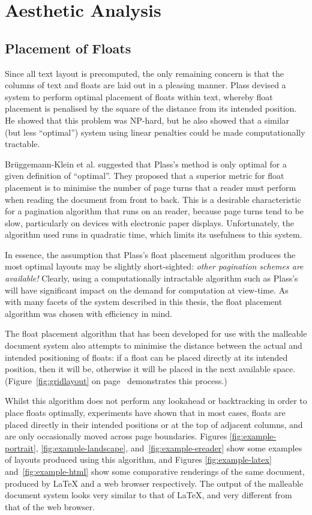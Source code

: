 \chapter{Aesthetic Analysis}\label{ch:aesthetics}

\section{Placement of Floats}
Since all text layout is precomputed, the only remaining concern is that the columns of text and floats are laid out in a pleasing manner. Plass\cite{Plass1981} devised a system to perform optimal placement of floats within text, whereby float placement is penalised by the square of the distance from its intended position. He showed that this problem was NP-hard, but he also showed that a similar (but less ``optimal'') system using linear penalties could be made computationally tractable.

Br\"uggemann-Klein et al.\cite{Bruggemann-Klein1995} suggested that Plass's method is only optimal for a given definition of ``optimal''. They proposed that a superior metric for float placement is to minimise the number of page turns that a reader must perform when reading the document from front to back. This is a desirable characteristic for a pagination algorithm that runs on an \ebook{} reader, because page turns tend to be slow, particularly on devices with electronic paper displays. Unfortunately, the algorithm used runs in quadratic time, which limits its usefulness to this system.

In essence, the assumption that Plass's float placement algorithm produces the most optimal layouts may be slightly short-sighted: \emph{other pagination schemes are available!} Clearly, using a computationally intractable algorithm such as Plass's will have significant impact on the demand for computation at view-time. As with many facets of the system described in this thesis, the float placement algorithm was chosen with efficiency in mind.

The float placement algorithm that has been developed for use with the malleable document system also attempts to minimise the distance between the actual and intended positioning of floats: if a float can be placed directly at its intended position, then it will be, otherwise it will be placed in the next available space. (Figure~\ref{fig:gridlayout} on page~\pageref{fig:gridlayout} demonstrates this process.)

Whilst this algorithm does not perform any lookahead or backtracking in order to place floats optimally, experiments have shown that in most cases, floats are placed directly in their intended positions or at the top of adjacent columns, and are only occasionally moved across page boundaries. Figures \ref{fig:example-portrait}, \ref{fig:example-landscape}, and~\ref{fig:example-ereader} show some examples of layouts produced using this algorithm, and Figures \ref{fig:example-latex} and~\ref{fig:example-html} show some comparative renderings of the same document, produced by \LaTeX{} and a web browser respectively. The output of the malleable document system looks very similar to that of \LaTeX, and very different from that of the web browser.

